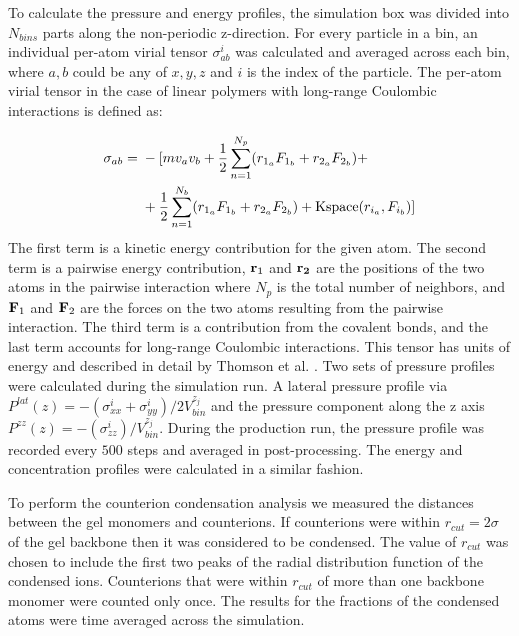 \documentclass[twoside,twocolumn,9pt]{article}
\begin{document}
To calculate the pressure and energy profiles, the simulation box was divided into $N_{bins}$ parts along the non-periodic z-direction. For every particle in a bin, an individual per-atom virial tensor $\sigma_{ab}^i$ was calculated and averaged across each bin, where $a, b$ could be any of $x, y, z$ and $i$ is the index of the particle.  The per-atom virial tensor in the case of linear polymers with long-range Coulombic interactions is defined as:

\begin{align}
\begin{split}\label{eq:stress_atom}
    \sigma_{ab} ={}& - [ m v_a v_b +
          \frac{1}{2} \sum_{n = 1}^{N_p} (r_{1_a} F_{1_b} + r_{2_a} F_{2_b}) + \\
         & + \frac{1}{2} \sum_{n = 1}^{N_b} (r_{1_a} F_{1_b} + r_{2_a} F_{2_b}) + 
          {\rm Kspace}(r_{i_a},F_{i_b}) ]
\end{split}
\end{align}
The first term is a kinetic energy contribution for the given atom. The second term is a pairwise energy contribution, ${\bf r}_1$ and $\bf{r}_2$ are the positions of the two atoms in the pairwise interaction where $N_p$ is the total number of neighbors, and ${\bf F}_1$ and ${\bf F}_2$ are the forces on the two atoms resulting from the pairwise interaction. The third term is a contribution from the covalent bonds, and the last term accounts for long-range Coulombic interactions. This tensor has units of energy and described in detail by Thomson et al. \citep{thompson2009general}. Two sets of pressure profiles were calculated during the simulation run. A lateral pressure profile via $P^{lat}(z)=-( \sigma_{xx}^i + \sigma_{yy}^i)/ 2V^{z_j}_{bin}$ and the pressure component along the z axis $P^{zz}(z)=-(\sigma_{zz}^i)/ V^{z_j}_{bin}$. During the production run, the pressure profile was recorded every $500$ steps and averaged in post-processing. The energy and concentration profiles were calculated in a similar fashion.

To perform the counterion condensation analysis we measured the distances between the gel monomers and counterions. If counterions were within $r_{cut} = 2 \sigma$ of the gel backbone then it was considered to be condensed. The value of $r_{cut}$ was chosen to include the first two peaks of the radial distribution function of the condensed ions. Counterions that were within $r_{cut}$ of more than one backbone monomer were counted only once. The results for the fractions of the condensed atoms were time averaged across the simulation.
\end{document}
